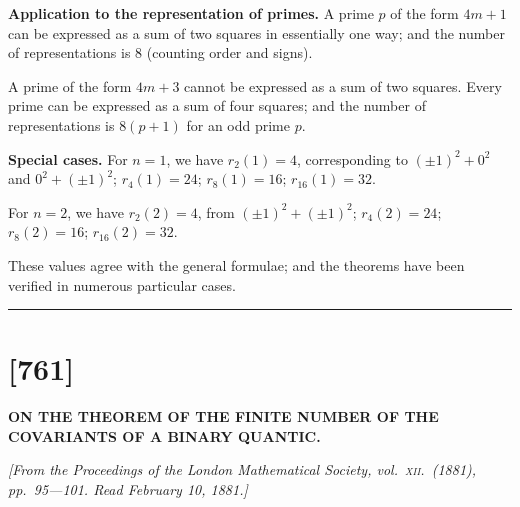 \documentclass[11pt,a4paper]{book}
\begin{document}
\textbf{Application to the representation of primes.} A prime $p$ of the form
$4m+1$ can be expressed as a sum of two squares in essentially one way;
and the number of representations is $8$ (counting order and signs).

A prime of the form $4m+3$ cannot be expressed as a sum of two squares.
Every prime can be expressed as a sum of four squares; and the number
of representations is $8(p+1)$ for an odd prime $p$.

\textbf{Special cases.} For $n=1$, we have $r_2(1) = 4$, corresponding to
$(\pm 1)^2 + 0^2$ and $0^2 + (\pm 1)^2$; $r_4(1) = 24$; $r_8(1) = 16$; $r_{16}(1) = 32$.

For $n=2$, we have $r_2(2) = 4$, from $(\pm 1)^2 + (\pm 1)^2$;
$r_4(2) = 24$; $r_8(2) = 16$; $r_{16}(2) = 32$.

These values agree with the general formulae; and the theorems have
been verified in numerous particular cases.

\vspace{1cm}
\begin{center}
\rule{0.3\textwidth}{0.4pt}
\end{center}
\clearpage


\setcounter{page}{301}


\section*{[761]}

\begin{center}
\textbf{ON THE THEOREM OF THE FINITE NUMBER OF THE COVARIANTS OF A BINARY QUANTIC.}
\end{center}

\noindent\textit{[From the \textit{Proceedings of the London Mathematical Society}, vol.\ \textsc{xii}.\ (1881), pp.\ 95---101. Read February 10, 1881.]}
\end{document}
